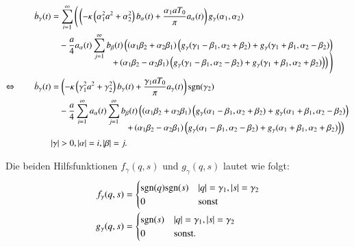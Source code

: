 \begin{align}
\dot{b}_\gamma(t)
&=
\sum_{i = 1}^{\infty}
\Bigg(
\left(
-
\kappa
\left(\alpha_1^2 a^2 + \alpha_2^2\right)
b_{\alpha}(t)
+
\frac{\alpha_1 a T_0}{\pi}
a_{\alpha}(t)
\right)
g_\gamma(\alpha_1, \alpha_2) 
\nonumber
\\
&\phantom{={}}
-
\frac{a}{4}
a_{\alpha}(t)
\sum_{j = 1}^{\infty}
b_{\beta}(t)
\left(
\left(\alpha_1 \beta_2 + \alpha_2 \beta_1 \right)
\left(
g_\gamma(\gamma_1 - \beta_1, \alpha_2 + \beta_2)
+
g_\gamma(\gamma_1 + \beta_1, \alpha_2 - \beta_2)
\right)
\right. \nonumber
\\[-3ex]
&\phantom{=-aat\sum\sum...{}}
\left.
+
\left(\alpha_1 \beta_2 - \alpha_2 \beta_1 \right)
\left(
g_\gamma(\gamma_1 - \beta_1, \alpha_2 - \beta_2)
+
g_\gamma(\gamma_1 + \beta_1, \alpha_2 + \beta_2)
\right)
\right)
\Bigg) \nonumber
\\
\Leftrightarrow \qquad
\dot{b}_\gamma(t)
&=
\left(
-
\kappa
\left(\gamma_1^2 a^2 + \gamma_2^2\right)
b_{\gamma}(t)
+
\frac{\gamma_1 a T_0}{\pi}
a_{\gamma}(t)
\right)
\sgn(\gamma_2) \nonumber
\\
&\phantom{={}}
-
\frac{a}{4}
\sum_{i = 1}^{\infty}
a_{\alpha}(t)
\sum_{j = 1}^{\infty}
b_{\beta}(t)
\left(
\left(\alpha_1 \beta_2 + \alpha_2 \beta_1 \right)
\left(
g_\gamma(\alpha_1 - \beta_1, \alpha_2 + \beta_2)
+
g_\gamma(\alpha_1 + \beta_1, \alpha_2 - \beta_2)
\right)
\right.\nonumber
\\[-2ex]
&\phantom{=-aat\sum..a..\sum...{}}
\left.
+
\left(\alpha_1 \beta_2 - \alpha_2 \beta_1 \right)
\left(
g_\gamma(\alpha_1 - \beta_1, \alpha_2 - \beta_2)
+
g_\gamma(\alpha_1 + \beta_1, \alpha_2 + \beta_2)
\right)
\right)
\label{equation:lorenz2:dotb}
\\
&|\gamma| > 0, |\alpha| = i, |\beta| = j.\nonumber
\end{align}

Die beiden Hilfsfunktionen $f_\gamma(q, s)$ und $g_\gamma(q, s)$ lautet wie 
folgt:
\begin{align*}
f_\gamma(q, s)
&=
\begin{cases}
\sgn(q)\sgn(s) & |q| = \gamma_1, |s| = \gamma_2 \\
0 & \text{sonst}
\end{cases}
\\
g_\gamma(q, s)
&=
\begin{cases}
\sgn(s) & |q| = \gamma_1, |s| = \gamma_2 \\
0 & \text{sonst}.
\end{cases}
\end{align*}
